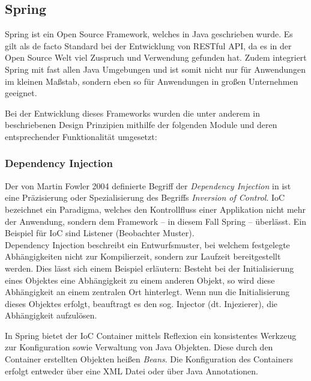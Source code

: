 		\subsection{Spring} %
		
			Spring ist ein Open Source Framework, welches in Java geschrieben wurde. Es gilt als de facto Standard bei der Entwicklung von RESTful API, da es in der Open Source Welt viel Zuspruch und Verwendung gefunden hat. Zudem integriert Spring mit fast allen Java Umgebungen und ist somit nicht nur für Anwendungen im kleinen Maßstab, sondern eben so für Anwendungen in großen Unternehmen geeignet. \cite{Walls.20162017} 
			
			Bei der Entwicklung dieses Frameworks wurden die unter anderem in \cite{Johnson.2003} beschriebenen Design Prinzipien mithilfe der folgenden Module und deren entsprechender Funktionalität umgesetzt:
			
			\subsubsection{Dependency Injection} %
			
				Der von Martin Fowler 2004 definierte Begriff der \textit{Dependency Injection} in \cite{MartinFowler.23.01.2020} ist eine Präzisierung oder Spezialisierung des Begriffs \textit{Inversion of Control}. \acs{IoC} bezeichnet ein Paradigma, welches den Kontrollfluss einer Applikation nicht mehr der Anwendung, sondern dem Framework -- in diesem Fall Spring -- überlässt. Ein Beispiel für \acs{IoC} sind Listener (Beobachter Muster). \\
				Dependency Injection beschreibt ein Entwurfsmuster, bei welchem festgelegte Abhängigkeiten nicht zur Kompilierzeit, sondern zur Laufzeit bereitgestellt werden. Dies lässt sich einem Beispiel erläutern: Besteht bei der Initialisierung eines Objektes eine Abhängigkeit zu einem anderen Objekt, so wird diese Abhängigkeit an einem zentralen Ort hinterlegt. Wenn nun die Initialisierung dieses Objektes erfolgt, beauftragt es den sog. Injector (dt. Injezierer), die Abhängigkeit aufzulösen. \cite{MartinFowler.23.01.2020}
				
				In Spring bietet der \acs{IoC} Container mittels Reflexion ein konsistentes Werkzeug zur Konfiguration sowie Verwaltung von Java Objekten. Diese durch den Container erstellten Objekten heißen \textit{Beans}. Die Konfiguration des Containers erfolgt entweder über eine \acs{XML} Datei oder über Java Annotationen. \cite{Walls.20162017} 
				
